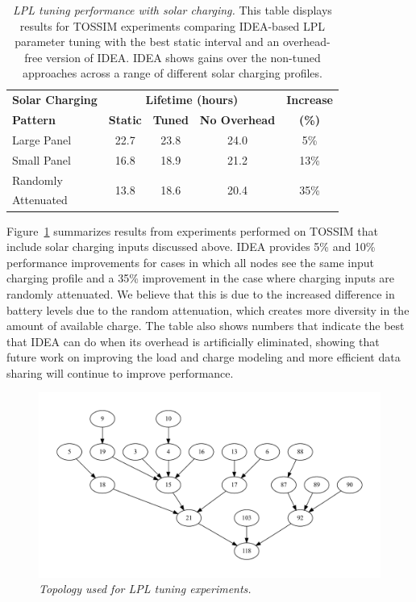 \documentclass{sig-alternate}
\begin{document}
\begin{table}[t]
\begin{center}
\begin{tabular}{|l|cccc|}
\hline
\textbf{Solar Charging} & \multicolumn{3}{c}{\textbf{Lifetime (hours)}} &
\textbf{Increase} \\
\textbf{Pattern} & \textbf{Static} & \textbf{Tuned} & \textbf{No Overhead} & \textbf{(\%)} \\ \hline
Large Panel & 22.7 & 23.8 & 24.0 & 5\% \\
Small Panel & 16.8 & 18.9 & 21.2 & 13\% \\
Randomly & \multirow{2}{*}{13.8} & \multirow{2}{*}{18.6} & \multirow{2}{*}{20.4} & \multirow{2}{*}{35\%} \\
Attenuated & & & & \\ \hline
\end{tabular}
\end{center}

\caption{\textit{LPL tuning performance with solar charging.} This table
displays results for TOSSIM experiments comparing IDEA-based LPL parameter
tuning with the best static interval and an overhead-free version of IDEA.
IDEA shows gains over the non-tuned approaches across a range of different
solar charging profiles.}

\label{table-lplvoptimaltossim}
\end{table}

Figure~\ref{table-lplvoptimaltossim} summarizes results from experiments
performed on TOSSIM that include solar charging inputs discussed above. IDEA
provides 5\% and 10\% performance improvements for cases in which all nodes
see the same input charging profile and a 35\% improvement in the case where
charging inputs are randomly attenuated. We believe that this is due to the
increased difference in battery levels due to the random attenuation, which
creates more diversity in the amount of available charge. The table also
shows numbers that indicate the best that IDEA can do when its overhead is
artificially eliminated, showing that future work on improving the load and
charge modeling and more efficient data sharing will continue to improve
performance.

\begin{figure}[t]
\begin{center}
\includegraphics[width=\hsize]{./figs/lpltune_topology.pdf}
\end{center}
\caption{\textit{Topology used for LPL tuning experiments.}}
\label{fig-lpltopology}
\end{figure}
\end{document}
